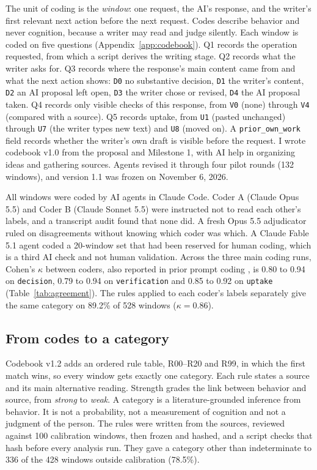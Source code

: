 \documentclass[manuscript,screen]{acmart}
\newcommand{\code}[1]{\texttt{#1}}
\begin{document}
The unit of coding is the \emph{window}: one request, the AI's response, and the writer's first relevant next action before the next request. Codes describe behavior and never cognition, because a writer may read and judge silently. Each window is coded on five questions (Appendix~\ref{app:codebook}). Q1 records the operation requested, from which a script derives the writing stage. Q2 records what the writer asks for. Q3 records where the response's main content came from and what the next action shows: \code{D0} no substantive decision, \code{D1} the writer's content, \code{D2} an AI proposal left open, \code{D3} the writer chose or revised, \code{D4} the AI proposal taken. Q4 records only visible checks of this response, from \code{V0} (none) through \code{V4} (compared with a source). Q5 records uptake, from \code{U1} (pasted unchanged) through \code{U7} (the writer types new text) and \code{U8} (moved on). A \code{prior\_own\_work} field records whether the writer's own draft is visible before the request. I wrote codebook v1.0 from the proposal and Milestone 1, with AI help in organizing ideas and gathering sources. Agents revised it through four pilot rounds (132 windows), and version 1.1 was frozen on November 6, 2026.

All windows were coded by AI agents in Claude Code. Coder A (Claude Opus 5.5) and Coder B (Claude Sonnet 5.5) were instructed not to read each other's labels, and a transcript audit found that none did. A fresh Opus 5.5 adjudicator ruled on disagreements without knowing which coder was which. A Claude Fable 5.1 agent coded a 20-window set that had been reserved for human coding, which is a third AI check and not human validation. Across the three main coding runs, Cohen's $\kappa$ \cite{cohen1960} between coders, also reported in prior prompt coding \cite{jelson2026chi,poquet2026}, is 0.80 to 0.94 on \code{decision}, 0.79 to 0.94 on \code{verification} and 0.85 to 0.92 on \code{uptake} (Table~\ref{tab:agreement}). The rules applied to each coder's labels separately give the same category on 89.2\% of 528 windows ($\kappa = 0.86$).

\subsection{From codes to a category}
\label{sec:rules}

Codebook v1.2 adds an ordered rule table, R00--R20 and R99, in which the first match wins, so every window gets exactly one category. Each rule states a source and its main alternative reading. Strength grades the link between behavior and source, from \emph{strong} to \emph{weak}. A category is a literature-grounded inference from behavior. It is not a probability, not a measurement of cognition and not a judgment of the person. The rules were written from the sources, reviewed against 100 calibration windows, then frozen and hashed, and a script checks that hash before every analysis run. They gave a category other than indeterminate to 336 of the 428 windows outside calibration (78.5\%).
\end{document}
